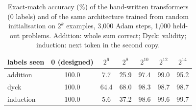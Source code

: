 \begin{table}[h]\centering
\begin{tabular}{lcccccc}\toprule
labels seen & 0 (designed) & $2^{6}$ & $2^{8}$ & $2^{10}$ & $2^{12}$ & $2^{14}$ \\\midrule
addition & 100.0 & 7.7 & 25.9 & 97.4 & 99.0 & 95.2 \\
dyck & 100.0 & 64.4 & 68.0 & 98.3 & 98.7 & 98.7 \\
induction & 100.0 & 5.6 & 37.2 & 98.6 & 99.6 & 99.7 \\
\bottomrule\end{tabular}
\caption{Exact-match accuracy (\%) of the hand-written transformers (0 labels) and of the same architecture trained from random initialisation on $2^k$ examples, 3{,}000 Adam steps, 1{,}000 held-out problems. Addition: whole sum correct; Dyck: validity; induction: next token in the second copy.}
\label{tab:transformer}
\end{table}
